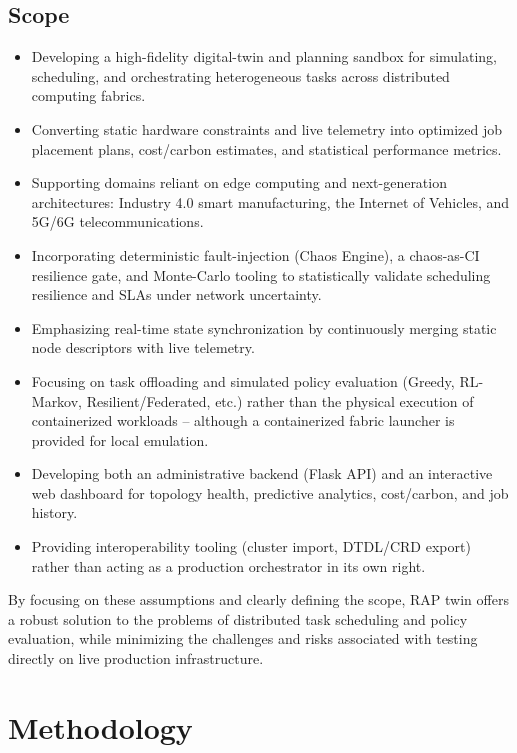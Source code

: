 \documentclass[12pt,a4]{report}
\begin{document}
\subsection{Scope}

\begin{itemize}
    \item Developing a high-fidelity digital-twin and planning sandbox for simulating, scheduling, and orchestrating heterogeneous tasks across distributed computing fabrics.
    \item Converting static hardware constraints and live telemetry into optimized job placement plans, cost/carbon estimates, and statistical performance metrics.
    \item Supporting domains reliant on edge computing and next-generation architectures: Industry 4.0 smart manufacturing, the Internet of Vehicles, and 5G/6G telecommunications.
    \item Incorporating deterministic fault-injection (Chaos Engine), a chaos-as-CI resilience gate, and Monte-Carlo tooling to statistically validate scheduling resilience and SLAs under network uncertainty.
    \item Emphasizing real-time state synchronization by continuously merging static node descriptors with live telemetry.
    \item Focusing on task offloading and simulated policy evaluation (Greedy, RL-Markov, Resilient/Federated, etc.) rather than the physical execution of containerized workloads -- although a containerized fabric launcher is provided for local emulation.
    \item Developing both an administrative backend (Flask API) and an interactive web dashboard for topology health, predictive analytics, cost/carbon, and job history.
    \item Providing interoperability tooling (cluster import, DTDL/CRD export) rather than acting as a production orchestrator in its own right.
\end{itemize}

By focusing on these assumptions and clearly defining the scope, RAP twin offers a robust solution to the problems of distributed task scheduling and policy evaluation, while minimizing the challenges and risks associated with testing directly on live production infrastructure.

\section{Methodology}
\end{document}

